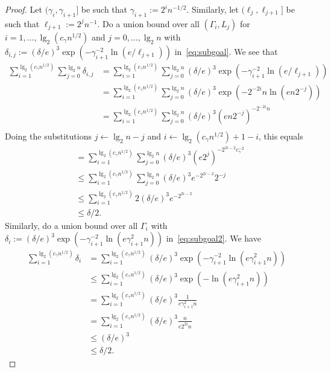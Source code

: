 \begin{proof}
Let $(\gamma_i, \gamma_{i+1}]$ be such that $\gamma_{i+1} := 2^{i}n^{-1/2}$. Similarly, let $(\ell_j, \ell_{j+1}]$ be such that $\ell_{j+1} := 2^j n^{-1}$. Do a union bound over all $(\Gamma_i, L_j)$ for $i=1,\dots,\lg_2(c_\gamma n^{1/2})$ and $j=0,\dots,\lg_2 n$ with $\delta_{i,j} := (\delta/e)^3 \exp(-\gamma_{i+1}^{-2} \ln(e/\ell_{j+1}))$ in~\eqref{eq:subgoal}. We see that
\begin{align*}
    \sum_{i=1}^{\lg_2(c_\gamma n^{1/2})} \sum_{j=0}^{\lg_2 n} \delta_{i,j} &= \sum_{i=1}^{\lg_2(c_\gamma n^{1/2})} \sum_{j=0}^{\lg_2 n} (\delta/e)^3 \exp(-\gamma_{i+1}^{-2} \ln(e/\ell_{j+1})) \\
    &= \sum_{i=1}^{\lg_2(c_\gamma n^{1/2})} \sum_{j=0}^{\lg_2 n}  (\delta/e)^3 \exp(- 2^{-2i}n \ln(e n 2^{-j})) \\
    &= \sum_{i=1}^{\lg_2(c_\gamma n^{1/2})} \sum_{j=0}^{\lg_2 n}  (\delta/e)^3 (e n 2^{-j})^{-2^{-2i}n} \\
\end{align*}
Doing the substitutions $j \gets \lg_2 n-j$ and $i \gets \lg_2(c_\gamma n^{1/2}) +1 - i$, this equals
\begin{align*}
    &= \sum_{i=1}^{\lg_2(c_\gamma n^{1/2})} \sum_{j=0}^{\lg_2 n}  (\delta/e)^3 (e 2^{j})^{-2^{2i-2}c_\gamma^{-2}} \\
    &\leq \sum_{i=1}^{\lg_2(c_\gamma n^{1/2})} \sum_{j=0}^{\lg_2 n}  (\delta/e)^3 e^{-2^{2i-2}} 2^{-j}\\ 
    &\leq \sum_{i=1}^{\lg_2(c_\gamma n^{1/2})} 2(\delta/e)^3 e^{-2^{2i-2}}\ \\
    &\leq \delta/2.
\end{align*}
Similarly, do a union bound over all $\Gamma_i$ with $\delta_i := (\delta/e)^3 \exp(-\gamma_{i+1}^{-2} \ln(e \gamma^2_{i+1} n))$ in~\eqref{eq:subgoal2}. We have
\begin{align*}
\sum_{i=1}^{\lg_2(c_\gamma n^{1/2})} \delta_i &= \sum_{i=1}^{\lg_2(c_\gamma n^{1/2})} (\delta/e)^3 \exp(-\gamma_{i+1}^{-2} \ln(e \gamma^2_{i+1} n)) \\
&\leq\sum_{i=1}^{\lg_2(c_\gamma n^{1/2})}(\delta/e)^3 \exp(-\ln(e \gamma^2_{i+1} n))\\
&= \sum_{i=1}^{\lg_2(c_\gamma n^{1/2})}(\delta/e)^3 \frac{1}{e \gamma_{i+1}^2 n} \\
&= \sum_{i=1}^{\lg_2(c_\gamma n^{1/2})}(\delta/e)^3 \frac{n}{e 2^{2i} n} \\
&\leq (\delta/e)^3 \\
&\leq \delta/2.
\end{align*}

\end{proof}

